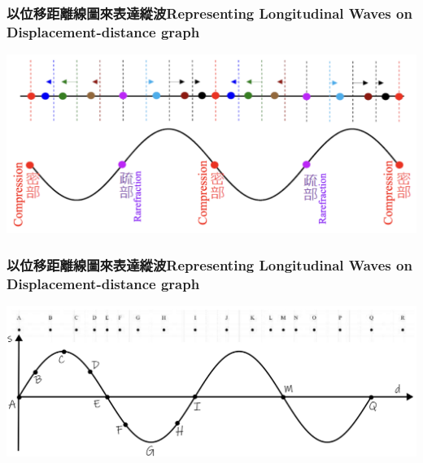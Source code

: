 \documentclass[beamer=true]{standalone}
\begin{document}
\begin{frame}
    \frametitle{以位移距離線圖來表達縱波Representing Longitudinal Waves on Displacement-distance graph}

    \par{\par\centering\includegraphics[width=\textwidth]{./img/ch1_2024-05-16-13-49-44.png}\par}

\end{frame}

\begin{frame}
    \frametitle{以位移距離線圖來表達縱波Representing Longitudinal Waves on Displacement-distance graph}
    \par{\par\centering\includegraphics[width=\textwidth]{./img/ch1b_2024-05-17-12-15-17.png}\par}
\end{frame}



\end{document}
